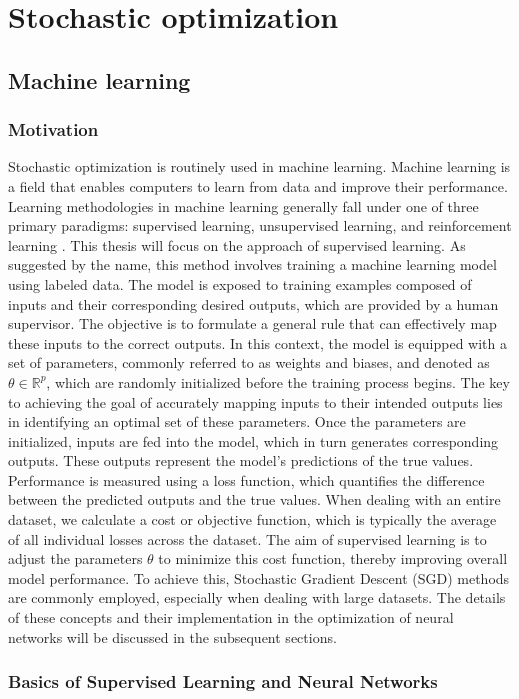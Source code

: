 \section{Stochastic optimization}
\subsection{Machine learning}
\subsubsection{Motivation}
Stochastic optimization is routinely used in machine learning. Machine learning is a field that enables computers to learn from data and improve their performance. Learning methodologies in machine learning generally fall under one of three primary paradigms: supervised learning, unsupervised learning, and reinforcement learning \cite[101-105]{Goodfellow-et-al-2016}. This thesis will focus on the approach of supervised learning. As suggested by the name, this method involves training a machine learning model using labeled data. The model is exposed to training examples composed of inputs and their corresponding desired outputs, which are provided by a human supervisor. The objective is to formulate a general rule that can effectively map these inputs to the correct outputs. In this context, the model is equipped with a set of parameters, commonly referred to as weights and biases, and denoted as $\theta \in \mathbb{R}^{p}$, which are randomly initialized before the training process begins. The key to achieving the goal of accurately mapping inputs to their intended outputs lies in identifying an optimal set of these parameters. Once the parameters are initialized, inputs are fed into the model, which in turn generates corresponding outputs. These outputs represent the model's predictions of the true values. Performance is measured using a loss function, which quantifies the difference between the predicted outputs and the true values. When dealing with an entire dataset, we calculate a cost or objective function, which is typically the average of all individual losses across the dataset. The aim of supervised learning is to adjust the parameters $\theta$ to minimize this cost function, thereby improving overall model performance. To achieve this, Stochastic Gradient Descent (SGD) methods are commonly employed, especially when dealing with large datasets. The details of these concepts and their implementation in the optimization of neural networks will be discussed in the subsequent sections.
\subsubsection{Basics of Supervised Learning and Neural Networks}\label{Basic_of_SL_FFNN}
